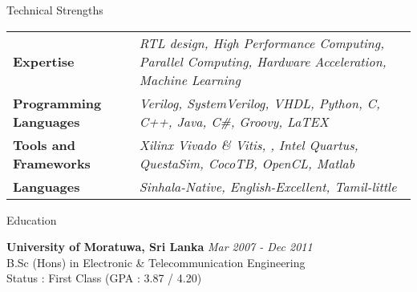 \documentclass[
11pt, %
]{./../assets/resume} %
\begin{document}
\begin{rSection}{Technical Strengths}
	
	\def\arraystretch{1.5}
	
	\begin{tabular}{p{2.0in} p{4.5in}}
		\textbf{Expertise} & \emph{RTL design, High Performance Computing, Parallel Computing, Hardware Acceleration, Machine Learning} \\
		\textbf{Programming Languages} & \emph{Verilog, SystemVerilog, VHDL, Python, C, C++, Java, C\#, Groovy, LaTEX} \\
		\textbf{Tools and Frameworks} & \emph{Xilinx Vivado \& Vitis, , Intel Quartus, QuestaSim, CocoTB, OpenCL, Matlab} \\ 
		\textbf{Languages} & \emph{Sinhala-Native, English-Excellent, Tamil-little} \\
	\end{tabular}
	
\end{rSection}


\begin{rSection}{Education}
	
	\textbf{University of Moratuwa, Sri Lanka} \hfill \textit{Mar 2007 - Dec 2011} \\ 
	B.Sc (Hons) in Electronic \& Telecommunication Engineering \\
	Status : First Class (GPA : 3.87 / 4.20)
	
\end{rSection}

\end{document}
